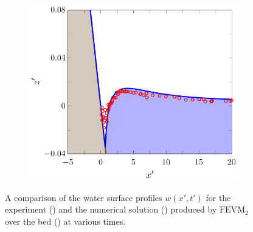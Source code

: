 \begin{figure}
\begin{subfigure}{0.5\textwidth}
		\vspace{0.5cm}
	\end{subfigure}
	\begin{subfigure}{0.5\textwidth}
		\includegraphics[width=\textwidth]{./chp6/figures/Experiment/Synolakis/H0p0185/FEVM/70s.pdf}
		\vspace{0.5cm}
	\end{subfigure}
	\caption{A comparison of the water surface profiles $w(x',t')$ for the experiment () and the numerical solution () produced by $\text{FEVM}_2$ over the bed () at various times.}
	\label{fig:SynolakisFEVMNoBreak}
\end{figure}
